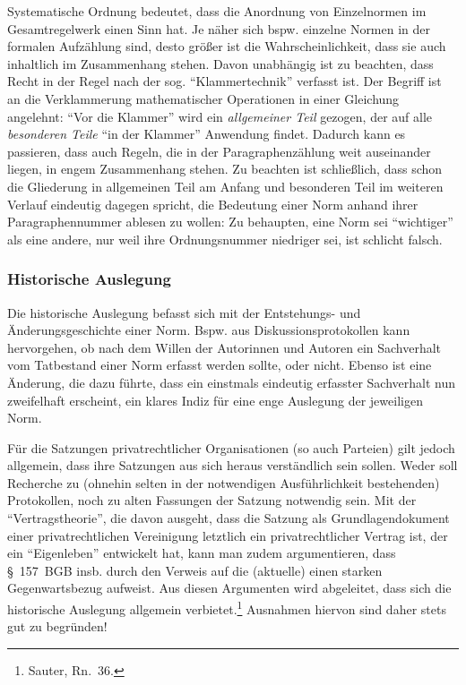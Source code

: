 Systematische Ordnung bedeutet, dass die Anordnung von Einzelnormen im Gesamtregelwerk einen Sinn hat. Je näher sich bspw. einzelne Normen in der formalen Aufzählung sind, desto größer ist die Wahrscheinlichkeit, dass sie auch inhaltlich im Zusammenhang stehen. Davon unabhängig ist zu beachten, dass Recht in der Regel nach der sog. \enquote{Klammertechnik} verfasst ist. Der Begriff ist an die Verklammerung mathematischer Operationen in einer Gleichung angelehnt: \enquote{Vor die Klammer} wird ein \emph{allgemeiner Teil} gezogen, der auf alle \emph{besonderen Teile} \enquote{in der Klammer} Anwendung findet. Dadurch kann es passieren, dass auch Regeln, die in der Paragraphenzählung weit auseinander liegen, in engem Zusammenhang stehen. Zu beachten ist schließlich, dass schon die Gliederung in allgemeinen Teil am Anfang und besonderen Teil im weiteren Verlauf eindeutig dagegen spricht, die Bedeutung einer Norm anhand ihrer Paragraphennummer ablesen zu wollen: Zu behaupten, eine Norm sei \enquote{wichtiger} als eine andere, nur weil ihre Ordnungsnummer niedriger sei, ist schlicht falsch. 

\subsubsection{Historische Auslegung}
Die historische Auslegung befasst sich mit der Entstehungs- und Änderungsgeschichte einer Norm. Bspw. aus Diskussionsprotokollen kann hervorgehen, ob nach dem Willen der Autorinnen und Autoren ein Sachverhalt vom Tatbestand einer Norm erfasst werden sollte, oder nicht. Ebenso ist eine Änderung, die dazu führte, dass ein einstmals eindeutig erfasster Sachverhalt nun zweifelhaft erscheint, ein klares Indiz für eine enge Auslegung der jeweiligen Norm.

Für die Satzungen privatrechtlicher Organisationen (so auch Parteien) gilt jedoch allgemein, dass ihre Satzungen aus sich heraus verständlich sein sollen. Weder soll Recherche zu (ohnehin selten in der notwendigen Ausführlichkeit bestehenden) Protokollen, noch zu alten Fassungen der Satzung notwendig sein. Mit der \enquote{Vertragstheorie}, die davon ausgeht, dass die Satzung als Grundlagendokument einer privatrechtlichen Vereinigung letztlich ein privatrechtlicher Vertrag ist, der ein \enquote{Eigenleben} entwickelt hat, kann man zudem argumentieren, dass \S~157~BGB insb. durch den Verweis auf die (aktuelle)  einen starken Gegenwartsbezug aufweist. Aus diesen Argumenten wird abgeleitet, dass sich die historische Auslegung allgemein verbietet.\footnote{Sauter, Rn.~36.} Ausnahmen hiervon sind daher stets gut zu begründen!

